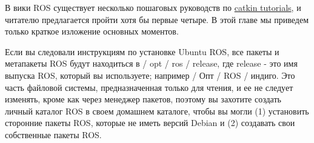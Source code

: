 

В вики ROS существует несколько пошаговых руководств по \href{http://wiki.ros.org/catkin/Tutorials}{catkin tutorials}, и читателю предлагается пройти хотя бы первые четыре. В этой главе мы приведем только краткое изложение основных моментов.

Если вы следовали инструкциям по установке Ubuntu ROS, все пакеты и метапакеты ROS будут находиться в / opt / ros / release, где release - это имя выпуска ROS, который вы используете; например / Опт / ROS / индиго. Это часть файловой системы, предназначенная только для чтения, и ее не следует изменять, кроме как через менеджер пакетов, поэтому вы захотите создать личный каталог ROS в своем домашнем каталоге, чтобы вы могли (1) установить сторонние пакеты ROS, которые не иметь версий Debian и (2) создавать свои собственные пакеты ROS.

